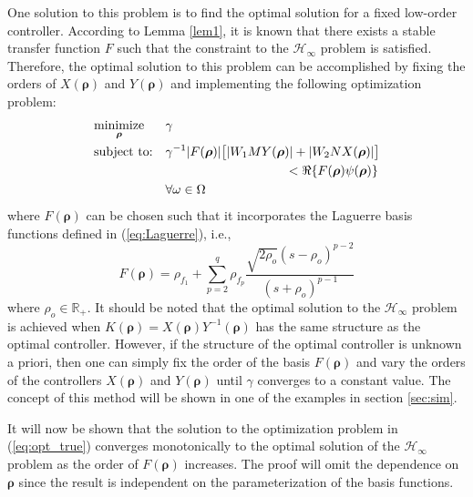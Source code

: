 \documentclass[letterpaper, 10 pt, conference]{ieeeconf}  %
\begin{document}
One solution to this problem is to find the optimal solution for a fixed low-order controller. According to Lemma \ref{lem1}, it is known that there exists a stable transfer function $F$ such that the constraint to the $\mathcal{H}_{\infty}$ problem is satisfied. Therefore, the optimal solution to this problem can be accomplished by fixing the orders of $X(\bm{\rho})$ and $Y(\bm{\rho})$ and implementing the following optimization problem:
\begin{equation} \label{eq:opt_true}
\begin{aligned}
& \underset{ \bm{\rho}}{\text{minimize}}
& & \gamma  \\
& \text{subject to:} & & \gamma^{-1} |F(\bm{\rho})|\big[  |W_1MY(\bm{\rho})| + |W_2 NX(\bm{\rho})| \big] \\ &&& \hspace{3.3cm}<   \Re\{F(\bm{\rho})\psi(\bm{\rho}) \}  \\ 
& & & \forall \omega \in \Omega \quad 
\end{aligned}
\end{equation}
where $F(\bm{\rho})$ can be chosen such that it incorporates the Laguerre basis functions defined in (\ref{eq:Laguerre}), i.e.,
\begin{equation} \label{eq:Laguerre_sum_c}
F(\bm{\rho}) = \rho_{f_{1}}+ \sum_{p=2}^{q} \rho_{f_{p}}\frac{\sqrt{2 \rho_o}(s-\rho_o)^{p-2}}{(s+\rho_o)^{p-1}}
\end{equation}
where $\rho_o \in \mathbb{R}_+$. It should be noted that the optimal solution to the $\mathcal{H}_\infty$ problem is achieved when $K(\bm{\rho}) = X(\bm{\rho})Y^{-1}(\bm{\rho})$ has the same structure as the optimal controller. However, if the structure of the optimal controller is unknown a priori, then one can simply fix the order of the basis $F(\bm{\rho})$ and vary the orders of the controllers $X(\bm{\rho})$ and $Y(\bm{\rho})$ until $\gamma$ converges to a constant value. The concept of this method will be shown in one of the examples in section \ref{sec:sim}.

It will now be shown that the solution to the optimization problem in (\ref{eq:opt_true}) converges monotonically to the optimal solution of the $\mathcal{H}_\infty$ problem as the order of $F(\bm{\rho})$ increases. The proof will omit the dependence on $\bm{\rho}$ since the result is independent on the parameterization of the basis functions.
\end{document}
